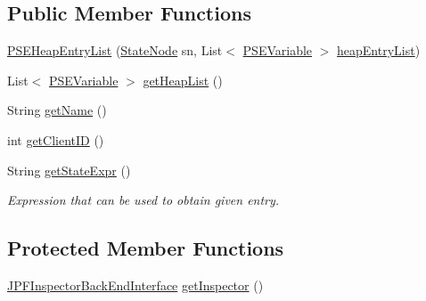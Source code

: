 \subsection*{Public Member Functions}
\begin{DoxyCompactItemize}
\item 
\hyperlink{classgov_1_1nasa_1_1jpf_1_1inspector_1_1common_1_1pse_1_1_p_s_e_heap_entry_list_a7e793bee3d4d563d3dc198340fada6b1}{P\+S\+E\+Heap\+Entry\+List} (\hyperlink{classgov_1_1nasa_1_1jpf_1_1inspector_1_1server_1_1programstate_1_1_state_node}{State\+Node} sn, List$<$ \hyperlink{classgov_1_1nasa_1_1jpf_1_1inspector_1_1common_1_1pse_1_1_p_s_e_variable}{P\+S\+E\+Variable} $>$ \hyperlink{classgov_1_1nasa_1_1jpf_1_1inspector_1_1common_1_1pse_1_1_p_s_e_heap_entry_list_a777716a1bbb347600a7b8c7ff40c9268}{heap\+Entry\+List})
\item 
List$<$ \hyperlink{classgov_1_1nasa_1_1jpf_1_1inspector_1_1common_1_1pse_1_1_p_s_e_variable}{P\+S\+E\+Variable} $>$ \hyperlink{classgov_1_1nasa_1_1jpf_1_1inspector_1_1common_1_1pse_1_1_p_s_e_heap_entry_list_aeabf7a5b53b2e125f535c2c1c9f9f584}{get\+Heap\+List} ()
\item 
String \hyperlink{classgov_1_1nasa_1_1jpf_1_1inspector_1_1common_1_1pse_1_1_program_state_entry_ac96b4ceba0c8c9c674b0cca509b63a3b}{get\+Name} ()
\item 
int \hyperlink{classgov_1_1nasa_1_1jpf_1_1inspector_1_1common_1_1pse_1_1_program_state_entry_a5f1b62c50f124c1bd01be0111706a1f5}{get\+Client\+ID} ()
\item 
String \hyperlink{classgov_1_1nasa_1_1jpf_1_1inspector_1_1common_1_1pse_1_1_program_state_entry_a9d819571ca1cc982a7d31df70548fd96}{get\+State\+Expr} ()
\begin{DoxyCompactList}\small\item\em Expression that can be used to obtain given entry. \end{DoxyCompactList}\end{DoxyCompactItemize}
\subsection*{Protected Member Functions}
\begin{DoxyCompactItemize}
\item 
\hyperlink{interfacegov_1_1nasa_1_1jpf_1_1inspector_1_1interfaces_1_1_j_p_f_inspector_back_end_interface}{J\+P\+F\+Inspector\+Back\+End\+Interface} \hyperlink{classgov_1_1nasa_1_1jpf_1_1inspector_1_1common_1_1pse_1_1_program_state_entry_ab04eadea7420b70405969a6b95656411}{get\+Inspector} ()
\end{DoxyCompactItemize}
